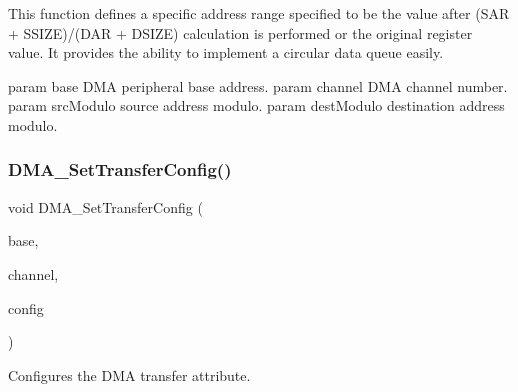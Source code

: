 This function defines a specific address range specified to be the value after (S\+AR + S\+S\+I\+ZE)/(D\+AR + D\+S\+I\+ZE) calculation is performed or the original register value. It provides the ability to implement a circular data queue easily.

param base D\+MA peripheral base address. param channel D\+MA channel number. param src\+Modulo source address modulo. param dest\+Modulo destination address modulo. \mbox{\label{group__dma_ga3cc33ab27c5c0dc71cff81795522629a}} 
\subsubsection{\texorpdfstring{DMA\_SetTransferConfig()}{DMA\_SetTransferConfig()}}
{\footnotesize\ttfamily void D\+M\+A\+\_\+\+Set\+Transfer\+Config (\begin{DoxyParamCaption}\item[{\mbox{\hyperlink{struct_d_m_a___type}{D\+M\+A\+\_\+\+Type}} $\ast$}]{base,  }\item[{uint32\+\_\+t}]{channel,  }\item[{const \mbox{\hyperlink{group__dma_gadb6e4baf9efcf14a889babc34d6f0d80}{dma\+\_\+transfer\+\_\+config\+\_\+t}} $\ast$}]{config }\end{DoxyParamCaption})}



Configures the D\+MA transfer attribute. 

